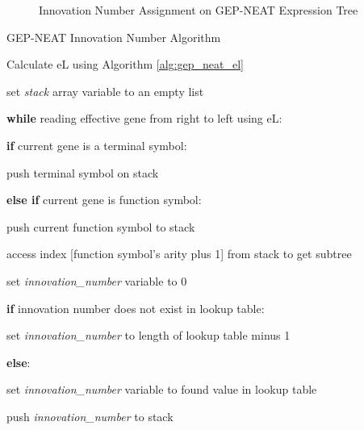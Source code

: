 \begin{figure}[H] %
	\centering %
	\caption{Innovation Number Assignment on GEP-NEAT Expression Tree}
	\label{fig:gep_neat_innovation_number} %
\end{figure}

\begin{algorithm}
	\caption{GEP-NEAT Innovation Number Algorithm}\label{alg:gep_neat_innovation_number}
	\begin{algorithmic}[1]
	\item Calculate eL using Algorithm \ref{alg:gep_neat_el}
	\item set \textit{stack} array variable to an empty list
	\item \textbf{while} reading effective gene from right to left using eL:
	\item \quad \textbf{if} current gene is a terminal symbol:
	\item \quad \quad push terminal symbol on stack
	\item \quad \textbf{else if} current gene is function symbol:
	\item \quad \quad push current function symbol to stack
	\item \quad \quad access index [function symbol's arity plus 1] from stack to get subtree
	\item \quad \quad set \textit{innovation\_number} variable to 0
	\item \quad \quad \textbf{if} innovation number does not exist in lookup table:
	\item \quad \quad \quad set \textit{innovation\_number}  to length of lookup table minus 1
	\item \quad \quad \textbf{else}:
	\item \quad \quad \quad set \textit{innovation\_number} variable to found value in lookup table
	\item \quad \quad push \textit{innovation\_number} to stack
\end{algorithmic}
\end{algorithm}

